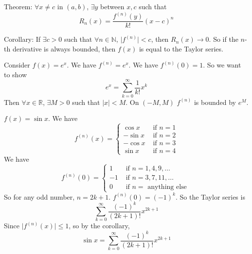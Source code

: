 \documentclass{report}
\begin{document}
Theorem: $\forall x \neq c$ in $(a, b)$, $\exists y$ between $x, c$ such that 
    \begin{equation*}
        R_{n}(x) = \dfrac{f^{(n)}(y)}{k!}(x - c)^{n}
    \end{equation*}

Corollary: If $\exists c> 0$ such that $\forall n \in \mathbb{N}$, $\lvert f^{(n)} \rvert < c$, then $R_{n}(x) \rightarrow 0$. So if the $n$-th derivative is always bounded, then $f(x)$ is equal to the Taylor series.

\begin{examples}
    \begin{example}
        Consider $f(x) = e^{x}$. We have $f^{(n)} = e^{x}$. We have $f^{(n)}(0) = 1$. So we want to show
            \begin{equation*}
                e^{x} = \sum_{k = 0}^{\infty}\dfrac{1}{k!}x^{k}
            \end{equation*}
        Then $\forall x \in \mathbb{R}$, $\exists M> 0$ such that $\lvert x \rvert< M$. On $(-M, M)$ $f^{(n)}$ is bounded by $e^{M}$.
    \end{example}
    \begin{example}
        $f(x) = \sin{x}$. We have
            \begin{equation*}
                f^{(n)}(x) = \begin{cases}
                    \cos{x} &\text{ if } n = 1 \\
                    -\sin{x} &\text{ if } n = 2 \\
                    -\cos{x} &\text{ if } n = 3 \\
                    \sin{}{x} &\text{ if } n = 4   
                \end{cases}
            \end{equation*}
        We have 
            \begin{equation*}
                f^{(n)}(0) = \begin{cases}
                    1 &\text{ if } n = 1, 4, 9, \ldots \\
                    -1 &\text{ if } n = 3, 7, 11, \ldots \\
                    0 &\text{ if } n = \text{ anything else }   
                \end{cases}
            \end{equation*}
        So for any odd number, $n = 2k + 1$. $f^{(n)}(0) = (-1)^{k}$. So the Taylor series is 
            \begin{equation*}
                \sum_{k = 0}^{\infty}\dfrac{(-1)^{k}}{(2k + 1)!}x^{2k + 1}
            \end{equation*}
        Since $\lvert f^{(n)}(x) \rvert \leq 1$, so by the corollary, 
            \begin{equation*}
                \sin{x} = \sum_{k = 0}^{\infty}\dfrac{(-1)^{k}}{(2k + 1)!}x^{2k + 1}
            \end{equation*}
    \end{example}
\end{examples}
\end{document}

